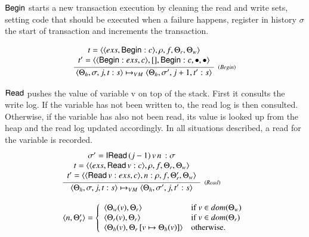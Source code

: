 \documentclass[3p,times,procedia]{elsarticle}
\theoremstyle{definition}
\newcommand{\C}[1]{\red{\mathsf{#1}}}
\begin{document}
\ensuremath{\C{Begin}} starts a new transaction execution by cleaning the read and write sets, setting code that should be executed
when a failure happens, register in history $\sigma$ the start of transaction and increments the transaction.

\[
  \infer[_{(Begin)}]
        { \langle \Theta_h,\sigma,j, t : s\rangle \mapsto_{VM}
          \langle \Theta_h,\sigma',j + 1, t' : s\rangle }
        {\begin{array}{c}
           t = \langle \langle exs, \ensuremath{\C{Begin}} : c\rangle,\rho, f,\Theta_r,\Theta_w\rangle \\ 
           t' = \langle \langle \ensuremath{\C{Begin}} : exs, c\rangle, [] , \ensuremath{\C{Begin}} : c,\bullet,\bullet\rangle
         \end{array}}
\]

\ensuremath{\C{Read}} pushes the value of variable v on top of the stack. First it consults the write log.
If the variable has not been written to, the read log is then consulted. Otherwise, if the variable has
also not been read, its value is looked up from the heap and the read log updated accordingly. In all situations described,
a read for the variable is recorded.
\[
  \begin{array}{l}
  \infer[_{(Read)}]
        {\langle \Theta_h,\sigma,j,t : s \rangle \mapsto_{VM}
         \langle \Theta_h,\sigma',j,t' : s \rangle}
        {\begin{array}{c}
            \sigma' = \ensuremath{\C{IRead}}\,(j-1)\,v\,n\, : \sigma\\
            t = \langle \langle exs, \ensuremath{\C{Read}}\,v : c\rangle,\rho,f,\Theta_r,\Theta_w\rangle \\
            t' = \langle  \langle \ensuremath{\C{Read}}\,v : exs, c\rangle ,n : \rho,f,\Theta_r',\Theta_w\rangle \\
         \end{array}} \\ \\
  \langle n , \Theta_r' \rangle 
       = \left \{
            \begin{array}{ll}
               \langle \Theta_w(v), \Theta_r \rangle & \text{if } v \in dom(\Theta_w)\\
               \langle \Theta_r(v), \Theta_r \rangle & \text{if } v \in dom(\Theta_r)\\
               \langle \Theta_h(v), \Theta_r\,[v \mapsto \Theta_h(v)]\rangle & \text{otherwise.} 
            \end{array}
         \right .
  \end{array} 
\]
\end{document}
